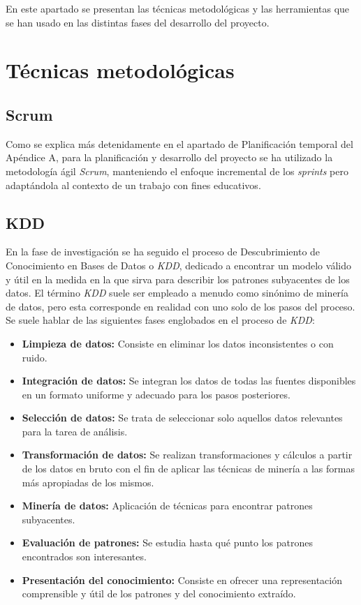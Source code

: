 
En este apartado se presentan las técnicas metodológicas y las herramientas que se han usado en las distintas fases del desarrollo del proyecto. 


\section{Técnicas metodológicas}

\subsection{Scrum}

Como se explica más detenidamente en el apartado de Planificación temporal del Apéndice A, para la planificación y desarrollo del proyecto se ha utilizado la metodología ágil \textit{Scrum}, manteniendo el enfoque incremental de los \textit{sprints} pero adaptándola al contexto de un trabajo con fines educativos. 

\subsection{KDD}

En la fase de investigación se ha seguido el proceso de Descubrimiento de Conocimiento en Bases de Datos o \textit{KDD}, dedicado a encontrar un modelo válido y útil en la medida en la que sirva para describir los patrones subyacentes de los datos. El término \textit{KDD} suele ser empleado a menudo como sinónimo de minería de datos, pero esta corresponde en realidad con uno solo de los pasos del proceso. Se suele hablar de las siguientes fases englobados en el proceso de \textit{KDD}: 

\begin{itemize}
	\item \textbf{Limpieza de datos:} Consiste en eliminar los datos inconsistentes o con ruido.  
	\item \textbf{Integración de datos:} Se integran los datos de todas las fuentes disponibles en un formato uniforme y adecuado para los pasos posteriores. 
	\item \textbf{Selección de datos:} Se trata de seleccionar solo aquellos datos relevantes para la tarea de análisis.  
	\item \textbf{Transformación de datos:} Se realizan transformaciones y cálculos a partir de los datos en bruto con el fin de aplicar las técnicas de minería a las formas más apropiadas de los mismos. 
	\item \textbf{Minería de datos:} Aplicación de técnicas para encontrar patrones subyacentes. 
	\item \textbf{Evaluación de patrones:} Se estudia hasta qué punto los patrones encontrados son interesantes. 
	\item \textbf{Presentación del conocimiento:} Consiste en ofrecer una representación comprensible y útil de los patrones y del conocimiento extraído. 
\end{itemize}

